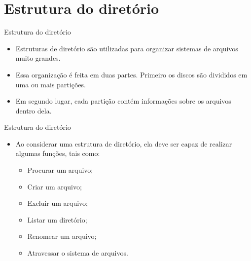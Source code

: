\documentclass[10pt,brazil]{beamer}
\begin{document}
\section{Estrutura do diretório} %
\begin{frame}{Estrutura do diretório}
\begin{itemize}
\item Estruturas de diretório são utilizadas para organizar sistemas de arquivos muito grandes.
\item Essa organização é feita em duas partes. Primeiro os discos são divididos em uma ou mais partições.
\item Em segundo lugar, cada partição contém informações sobre os arquivos dentro dela. 
\end{itemize}
\end{frame}

\begin{frame}{Estrutura do diretório}
\begin{itemize}
\item Ao considerar uma estrutura de diretório, ela deve ser capaz de realizar algumas funções, tais como:
	\begin{itemize}
	\item Procurar um arquivo;
	\item Criar um arquivo;
	\item Excluir um arquivo;
	\item Listar um diretório;
	\item Renomear um arquivo;
	\item Atravessar o sistema de arquivos.
	\end{itemize}
\end{itemize}
\end{frame}
\end{document}
